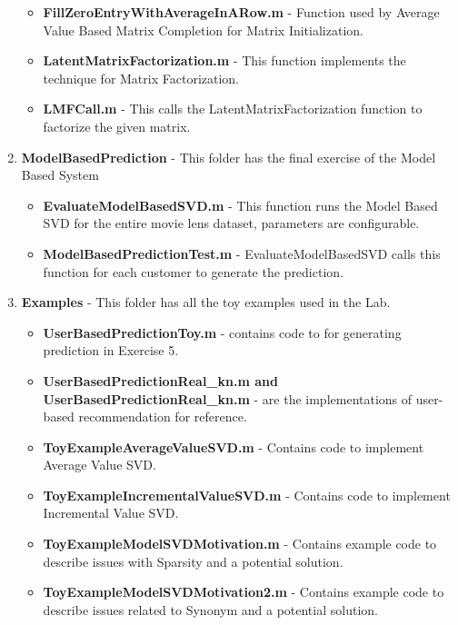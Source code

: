\begin{enumerate}
\begin{itemize}
\item \textbf{FillZeroEntryWithAverageInARow.m} - Function used by Average Value Based Matrix Completion for Matrix Initialization.
\item \textbf{LatentMatrixFactorization.m} - This function implements the technique for Matrix Factorization.
\item \textbf{LMFCall.m} - This calls the LatentMatrixFactorization function to factorize the given matrix.
\end
{itemize}
\item \textbf{ModelBasedPrediction} - This folder has the final exercise of the Model Based System
\begin{itemize}
\item \textbf{EvaluateModelBasedSVD.m} - This function runs the Model Based SVD for the entire movie lens dataset, parameters are configurable.
\item \textbf{ModelBasedPredictionTest.m} - EvaluateModelBasedSVD calls this function for each customer to generate the prediction.
\end{itemize}
\item \textbf{Examples} - This folder has all the toy examples used in the Lab.
\begin{itemize}
\item \textbf{UserBasedPredictionToy.m} - contains code to for generating prediction in Exercise 5.
\item \textbf{UserBasedPredictionReal\_kn.m and UserBasedPredictionReal\_kn.m} - are the implementations of user-based recommendation for reference.
\item \textbf{ToyExampleAverageValueSVD.m} - Contains code to implement Average Value SVD.
\item \textbf{ToyExampleIncrementalValueSVD.m} - Contains code to implement Incremental Value SVD.
\item \textbf{ToyExampleModelSVDMotivation.m} - Contains example code to describe issues with Sparsity and a potential solution.
\item \textbf{ToyExampleModelSVDMotivation2.m} - Contains example code to describe issues related to Synonym and a potential solution.
 
\end{itemize}
\end{enumerate}
